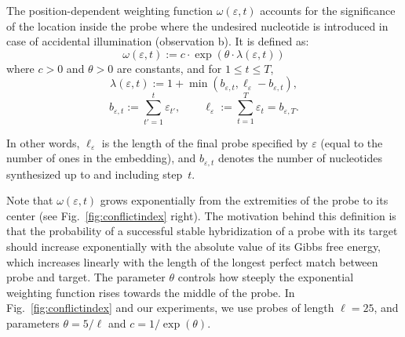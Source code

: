 \documentclass{w-edbk}
\newcommand{\ignore}[1]{}
\newcommand{\eps}{\varepsilon}
\begin{document}
The position-dependent weighting function $\omega(\eps,t)$ accounts for
the significance of the location inside the probe where the undesired nucleotide
is introduced in case of accidental illumination (observation b). It is defined
as:
\begin{equation}\label{eq:pos_mult}
\omega(\eps,t) := c \cdot \exp{\left(\theta \cdot \lambda(\eps,t)\right)}
\end{equation}
where $c>0$ and $\theta>0$ are constants, and for $1\leq t\leq T$,
\begin{equation}\label{eq:base_pos}
  \lambda(\eps,t) := 1 + \min(b_{\eps,t},\ell_{\eps} - b_{\eps,t}),
\end{equation}
\begin{equation}\label{eq:b_ell}
  b_{\eps,t} := \sum_{t'=1}^{t} \eps_{t'},
  \qquad
  \ell_{\eps} := \sum_{t=1}^{T} \eps_t = b_{\eps,T}.
\end{equation}

In other words, $\ell_\eps$ is the length of the final probe specified
by $\eps$ (equal to the number of ones in the embedding), and
$b_{\eps,t}$ denotes the number of nucleotides synthesized up to and
including step~$t$.

Note that $\omega(\eps,t)$ grows exponentially from the extremities of the
probe to its center (see Fig.~\ref{fig:conflictindex} right). The motivation
behind this definition is that the probability of a successful stable
hybridization of a probe with its target should increase exponentially with
the absolute value of its Gibbs free energy, which increases linearly with the
length of the longest perfect match between probe and target. The parameter
$\theta$ controls how steeply the exponential weighting function rises towards
the middle of the probe. In Fig.~\ref{fig:conflictindex} and our experiments,
we use probes of length $\ell=25$, and parameters $\theta = 5/\ell$ and $c =
1/\exp{(\theta)}$.

\ignore{It is generally agreed that the chances of a successful hybridization
  between probe and target are higher if a mismatched base occurs at the
  extremities of the formed duplex instead of at its center. The precise
  effects of this position, however, is not yet fully understood and has been
  an active topic of research \citep{BINDER05}.}
\end{document}
